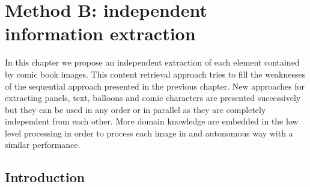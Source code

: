 \chapter{Method B: independent information extraction}
\label{chap:independent}
\graphicspath{{./chapters/4-independent/figs/}}


In this chapter we propose an independent extraction of each element contained by comic book images.
This content retrieval approach tries to fill the weaknesses of the sequential approach presented in the previous chapter.
New approaches for extracting panels, text, balloons and comic characters are presented successively but they can be used in any order or in parallel as they are completely independent from each other.
More domain knowledge are embedded in the low level processing in order to process each image in and autonomous way with a similar performance.


\section{Introduction}
\label{sec:in:intro}

